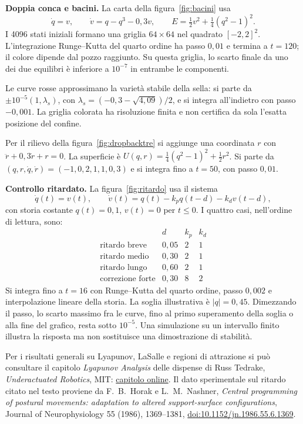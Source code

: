 \documentclass[11pt,a4paper,twoside=false,headinclude,footinclude]{scrartcl}
\begin{document}
\begin{formule}
\textbf{Doppia conca e bacini.} La carta della figura~\ref{fig:bacini} usa
\[
 \dot q=v,\qquad \dot v=q-q^3-0{,}3v,\qquad
 E=\tfrac12v^2+\tfrac14(q^2-1)^2.
\]
I 4096 stati iniziali formano una griglia $64\times64$ nel quadrato $[-2,2]^2$. L'integrazione Runge--Kutta del quarto ordine ha passo $0{,}01$ e termina a $t=120$; il colore dipende dal pozzo raggiunto. Su questa griglia, lo scarto finale da uno dei due equilibri è inferiore a $10^{-7}$ in entrambe le componenti.

Le curve rosse approssimano la varietà stabile della sella: si parte da $\pm10^{-5}(1,\lambda_s)$, con $\lambda_s=(-0{,}3-\sqrt{4{,}09})/2$, e si integra all'indietro con passo $-0{,}001$. La griglia colorata ha risoluzione finita e non certifica da sola l'esatta posizione del confine.

Per il rilievo della figura~\ref{fig:dropbacktre} si aggiunge una coordinata $r$ con $\ddot r+0{,}3\dot r+r=0$. La superficie è $U(q,r)=\tfrac14(q^2-1)^2+\tfrac12r^2$. Si parte da $(q,r,\dot q,\dot r)=(-1,0{,}2,1{,}1,0{,}3)$ e si integra fino a $t=50$, con passo $0{,}01$.
\end{formule}

\begin{formule}
\textbf{Controllo ritardato.} La figura~\ref{fig:ritardo} usa il sistema
\[
 \dot q(t)=v(t),\qquad
 \dot v(t)=q(t)-k_pq(t-d)-k_dv(t-d),
\]
con storia costante $q(t)=0{,}1$, $v(t)=0$ per $t\le0$. I quattro casi, nell'ordine di lettura, sono:
\[
\begin{array}{lccc}
 &d&k_p&k_d\\
 \text{ritardo breve}&0{,}05&2&1\\
 \text{ritardo medio}&0{,}30&2&1\\
 \text{ritardo lungo}&0{,}60&2&1\\
 \text{correzione forte}&0{,}30&8&2
\end{array}
\]
Si integra fino a $t=16$ con Runge--Kutta del quarto ordine, passo $0{,}002$ e interpolazione lineare della storia. La soglia illustrativa è $|q|=0{,}45$. Dimezzando il passo, lo scarto massimo fra le curve, fino al primo superamento della soglia o alla fine del grafico, resta sotto $10^{-5}$. Una simulazione su un intervallo finito illustra la risposta ma non sostituisce una dimostrazione di stabilità.
\end{formule}

Per i risultati generali su Lyapunov, LaSalle e regioni di attrazione si può consultare il capitolo \emph{Lyapunov Analysis} delle dispense di Russ Tedrake, \emph{Underactuated Robotics}, MIT: \href{https://underactuated.mit.edu/lyapunov.html}{capitolo online}. Il dato sperimentale sul ritardo citato nel testo proviene da F.~B.~Horak e L.~M.~Nashner, \emph{Central programming of postural movements: adaptation to altered support-surface configurations}, Journal of Neurophysiology 55 (1986), 1369--1381, \href{https://doi.org/10.1152/jn.1986.55.6.1369}{doi:10.1152/jn.1986.55.6.1369}.
\end{document}

